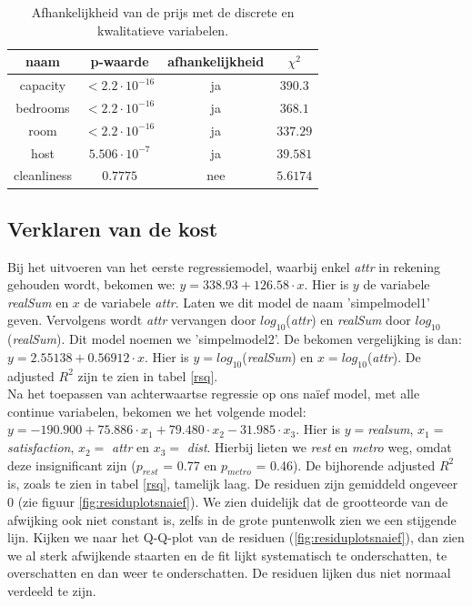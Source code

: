 \documentclass[a4paper]{kulakarticle}
\begin{document}
	\begin{table}[h]
		\centering
		\begin{tabular}{c|c|c|c }
			naam & p-waarde & afhankelijkheid & $\chi ^2$\\
			\hline
			\hline
			capacity &$ < 2.2\cdot 10^{-16}$& ja& $390.3$ \\ 
			bedrooms &$ < 2.2\cdot 10^{-16}$& ja&$368.1 $ \\
			room &$ < 2.2\cdot 10^{-16}$& ja&$ 337.29$ \\
			host &$ 5.506\cdot 10^{-7}$& ja&$39.581 $ \\
			cleanliness & $0.7775$&nee& $5.6174$ \\
		\end{tabular}
		\caption{Afhankelijkheid van de prijs met de discrete en kwalitatieve variabelen.}
		\label{discrete variabelen afhankelijkheid}
	\end{table}
	
	\subsection{Verklaren van de kost}
	
	Bij het uitvoeren van het eerste regressiemodel, waarbij enkel \textit{attr} in rekening gehouden wordt, bekomen we: 
    $ y = 338.93 + 126.58\cdot x$. Hier is $y$ de variabele \textit{realSum} en $x$ de variabele \textit{attr}. Laten we dit model de naam 'simpelmodel1' geven. Vervolgens wordt \textit{attr} vervangen door $log_{10}$(\textit{attr}) en \textit{realSum} door $log_{10}$(\textit{realSum}). Dit model noemen we 'simpelmodel2'. De bekomen vergelijking is dan: $ y = 2.55138 + 0.56912\cdot x$. Hier is $y = log_{10}$(\textit{realSum}) en $x = log_{10}$(\textit{attr}). De adjusted $R^2$ zijn te zien in tabel \ref{rsq}.\\
	Na het toepassen van achterwaartse regressie op ons naïef model, met alle continue variabelen, bekomen we het volgende model: $y = -190.900 + 75.886\cdot x_1 + 79.480\cdot x_2 -31.985\cdot x_3$. Hier is $y =$\textit{realsum}, $x_1 = $ \textit{satisfaction}, $x_2 =$ \textit{attr} en $x_3 =$ \textit{dist}. Hierbij lieten we \textit{rest} en \textit{metro} weg, omdat deze insignificant zijn ($p_{rest}$ = 0.77 en $p_{metro}$ = 0.46). De bijhorende adjusted $R^2$ is, zoals te zien in tabel \ref{rsq}, tamelijk laag. De residuen zijn gemiddeld ongeveer 0 (zie figuur \ref{fig:residuplotsnaief}). We zien duidelijk dat de grootteorde van de afwijking ook niet constant is, zelfs in de grote puntenwolk zien we een stijgende lijn. Kijken we naar het Q-Q-plot van de residuen (\ref{fig:residuplotsnaief}), dan zien we al sterk afwijkende staarten en de fit lijkt systematisch te onderschatten, te overschatten en dan weer te onderschatten. De residuen lijken dus niet normaal verdeeld te zijn. \\
	
\end{document}
